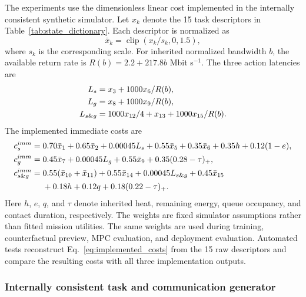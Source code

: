 \documentclass[remotesensing,article,submit,moreauthors]{Definitions/mdpi}
\DeclareMathOperator{\clip}{clip}
\begin{document}
The experiments use the dimensionless linear cost implemented in the internally consistent synthetic simulator. Let $x_k$ denote the 15 task descriptors in Table~\ref{tab:state_dictionary}. Each descriptor is normalized as
\begin{equation}
\bar x_k=\clip(x_k/s_k,0,1.5),
\end{equation}
where $s_k$ is the corresponding scale. For inherited normalized bandwidth $b$, the available return rate is $R(b)=2.2+217.8b$ Mbit s$^{-1}$. The three action latencies are
\begin{align}
L_s&=x_3+1000x_6/R(b),\notag\\
L_g&=x_8+1000x_9/R(b),\notag\\
L_{s\&g}&=1000x_{12}/4+x_{13}+1000x_{15}/R(b).
\label{eq:latencies}
\end{align}
The implemented immediate costs are
\begin{align}
c_s^{imm}={}&0.70\bar x_1+0.65\bar x_2+0.00045L_s+0.55\bar x_5
+0.35\bar x_6+0.35h+0.12(1-e),\notag\\
c_g^{imm}={}&0.45\bar x_7+0.00045L_g+0.55\bar x_9
+0.35(0.28-\tau)_+,\notag\\
c_{s\&g}^{imm}={}&0.55(\bar x_{10}+\bar x_{11})+0.55\bar x_{14}
+0.00045L_{s\&g}+0.45\bar x_{15}\notag\\
&+0.18h+0.12q+0.18(0.22-\tau)_+.
\label{eq:implemented_costs}
\end{align}
Here $h$, $e$, $q$, and $\tau$ denote inherited heat, remaining energy, queue occupancy, and contact duration, respectively. The weights are fixed simulator assumptions rather than fitted mission utilities. The same weights are used during training, counterfactual preview, MPC evaluation, and deployment evaluation. Automated tests reconstruct Eq.~\eqref{eq:implemented_costs} from the 15 raw descriptors and compare the resulting costs with all three implementation outputs.

\begin{table}[H]
\centering
\caption{Implemented 15-dimensional task descriptor dictionary. The complete 24-dimensional observation adds normalized time, the sine and cosine of link phase, and six resource coordinates: $h$, $e$, $q$, compute utilization $u$, bandwidth $b$, and contact duration $\tau$.}
\label{tab:state_dictionary}
\resizebox{\textwidth}{!}{}
\end{table}

\subsubsection{Internally consistent task and communication generator}
\end{document}
